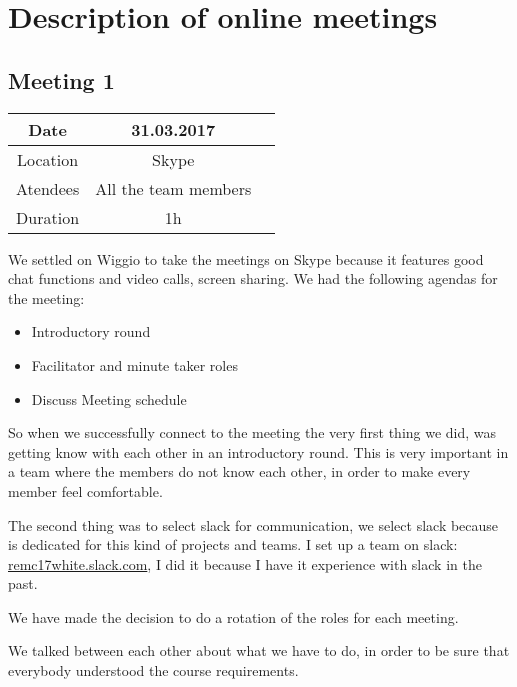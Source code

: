 
\chapter{Description of online meetings} %

\label{Meetings} %

\section{Meeting 1}
\begin{center}
\begin{tabular}{| c | c | c }
	\hline
	Date &  31.03.2017   \\
	\hline
	Location & Skype  \\
	\hline
	Atendees & All the team members   \\
	\hline
	Duration & 1h  \\
	\hline
\end{tabular}
\end{center}
We settled on Wiggio to take the meetings on Skype because it features good chat functions and video calls, screen sharing. 
We had the following agendas for the meeting: 
\begin{itemize}
	\item	Introductory round
	\item	Facilitator and minute taker roles
	\item	Discuss Meeting schedule
\end{itemize}

So when we successfully connect to the meeting the very first thing we did, was getting know with each other in an introductory round. This is very important in a team where the members do not know each other, in order to make every member feel comfortable. 

The second thing was to select slack for communication, we select slack because is dedicated for this kind of projects and teams. I set up a team on slack: \href{https://remc17white.slack.com}{remc17white.slack.com}, I did it because I have it experience with slack in the past.

We have made the decision to do a rotation of the roles for each meeting.

We talked between each other about what we have to do, in order to be sure that everybody understood the course requirements.
 
